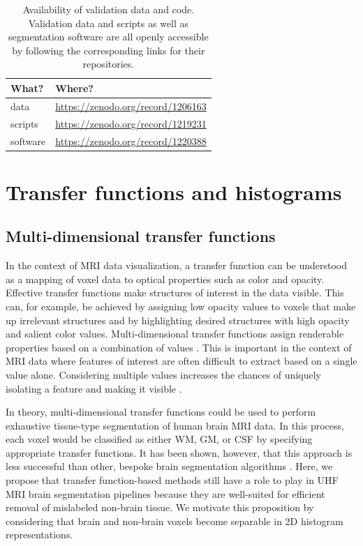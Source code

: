 \begin{table}[htb!]
\centering
\caption{Availability of validation data and code. Validation data and scripts as well as segmentation software are all openly accessible by following the corresponding links for their repositories.}
\begin{tabular}{ll}
\\
\toprule
What? & Where? \\
\midrule
data & \url{https://zenodo.org/record/1206163}\\
scripts & \url{https://zenodo.org/record/1219231}\\
software & \url{https://zenodo.org/record/1220388}\\
\bottomrule
\end{tabular}
\label{tab:availability}
\end{table}

\section{Transfer functions and histograms}
\label{sec:Theory}

\subsection{Multi-dimensional transfer functions}
In the context of MRI data visualization, a transfer function can be understood as a mapping of voxel data to optical properties such as color and opacity. Effective transfer functions make structures of interest in the data visible. This can, for example, be achieved by assigning low opacity values to voxels that make up irrelevant structures and by highlighting desired structures with high opacity and salient color values. Multi-dimensional transfer functions assign renderable properties based on a combination of values \parencite{Kniss2002, Kindlmann1998, Kniss2005, Kniss2001}. This is important in the context of MRI data where features of interest are often difficult to extract based on a single value alone. Considering multiple values increases the chances of uniquely isolating a feature and making it visible \parencite{Kniss2002}.

In theory, multi-dimensional transfer functions could be used to perform exhaustive tissue-type segmentation of human brain MRI data. In this process, each voxel would be classified as either WM, GM, or CSF by specifying appropriate transfer functions. It has been shown, however, that this approach is less successful than other, bespoke brain segmentation algorithms \parencite{Ljung2016}. Here, we propose that transfer function-based methods still have a role to play in UHF MRI brain segmentation pipelines because they are well-suited for efficient removal of mislabeled non-brain tissue. We motivate this proposition by considering that brain and non-brain voxels become separable in 2D histogram representations.


